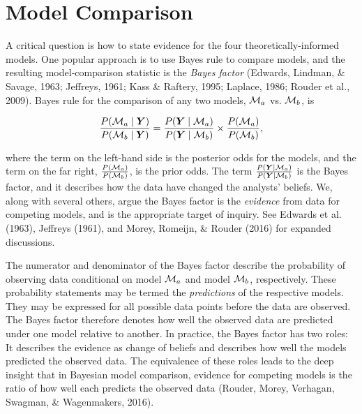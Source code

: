 \documentclass[american,man]{apa6}
\begin{document}
\section{Model Comparison}\label{model-comparison}

A critical question is how to state evidence for the four
theoretically-informed models. One popular approach is to use Bayes rule
to compare models, and the resulting model-comparison statistic is the
\emph{Bayes factor} (Edwards, Lindman, \& Savage, 1963; Jeffreys, 1961;
Kass \& Raftery, 1995; Laplace, 1986; Rouder et al., 2009). Bayes rule
for the comparison of any two models, \({\cal M}_a\) vs. \({\cal M}_b\), is

\begin{equation}\label{bayesrule}
\frac{P({\cal M}_a \mid \bm Y)}{P({\cal M}_b \mid \bm Y)} = \frac{P(\bm Y \mid {\cal M}_a)}{P(\bm Y \mid {\cal M}_b)} \times \frac{P({\cal M}_a)}{P({\cal M}_b)},
\end{equation}

where the term on the left-hand side is the posterior odds for the
models, and the term on the far right,
\(\frac{P({\cal M}_a)}{P({\cal M}_b)}\), is the prior odds. The term
\(\frac{P(\bm Y \mid {\cal M}_a)}{P(\bm Y \mid {\cal M}_b)}\) is the Bayes
factor, and it describes how the data have changed the analysts'
beliefs. We, along with several others, argue the Bayes factor is the
\emph{evidence} from data for competing models, and is the appropriate
target of inquiry. See Edwards et al. (1963), Jeffreys (1961), and
Morey, Romeijn, \& Rouder (2016) for expanded discussions.

The numerator and denominator of the Bayes factor describe the
probability of observing data conditional on model \({\cal M}_a\) and model
\({\cal M}_b\), respectively. These probability statements may be termed
the \emph{predictions} of the respective models. They may be expressed
for all possible data points before the data are observed. The Bayes
factor therefore denotes how well the observed data are predicted under
one model relative to another. In practice, the Bayes factor has two
roles: It describes the evidence as change of beliefs and describes how
well the models predicted the observed data. The equivalence of these
roles leads to the deep insight that in Bayesian model comparison,
evidence for competing models is the ratio of how well each predicts the
observed data (Rouder, Morey, Verhagan, Swagman, \& Wagenmakers, 2016).
\end{document}
